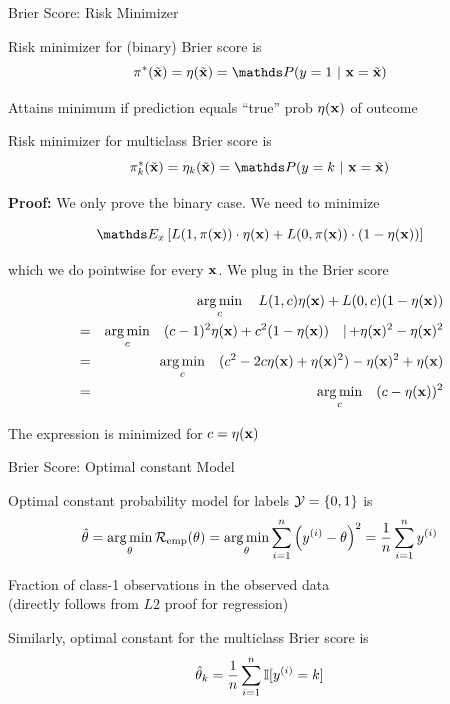 \documentclass[11pt,compress,t,notes=noshow, xcolor=table]{beamer}
\begin{document}
\begin{vbframe}{Brier Score: Risk Minimizer}

\begin{itemizeL}
    \item Risk minimizer for (binary) Brier score is $$\piastxtil = \eta(\xtil) = \P(y=1~|~\xv = \xtil)$$
    \item Attains minimum if prediction equals \enquote{true} prob $\eta(\mathbf{x})$ of outcome
    \item Risk minimizer for multiclass Brier score is 
$$\pi^{\ast}_k(\xtil) = \eta_k(\xtil) =  \P(y = k ~|~ \xv = \xtil) $$
\end{itemizeL}

\framebreak
\textbf{Proof: } We only prove the binary case. We need to minimize 

$$
\E_x \left[L(1, \pix) \cdot \eta(\xv) + L(0, \pix) \cdot (1 - \eta(\xv)) \right]
$$

which we do pointwise for every $\mathbf{x}$. We plug in the Brier score

\vspace*{-0.3cm}

\begin{eqnarray*}
	&& \mathop{\mathrm{arg\,min}}_c \quad L(1, c) \eta(\mathbf{x}) + L(0, c) (1 - \eta(\mathbf{x})) \\ 
	&=&  \mathop{\mathrm{arg\,min}}_c \quad (c - 1)^2 \eta(\mathbf{x}) + c^2 (1 - \eta(\mathbf{x}))  \quad |{\,+\eta(\mathbf{x})^2-\eta(\mathbf{x})^2}\\
  &=&  \mathop{\mathrm{arg\,min}}_c \quad (c^2 -2c\eta(\mathbf{x}) + \eta(\mathbf{x})^2)- \eta(\mathbf{x})^2 + \eta(\mathbf{x}) \\
	&=&  \mathop{\mathrm{arg\,min}}_c \quad (c - \eta(\mathbf{x}))^2
\end{eqnarray*}

The expression is minimized for $c = \eta(\mathbf{x})$

\end{vbframe}

\begin{vbframe}{Brier Score: Optimal constant Model}

\begin{itemizeL}
    \item Optimal constant probability model for labels $\mathcal{Y} = \{0, 1\}$ is 
    $$\hat{\theta}=\mathop{\mathrm{arg\,min}}_{\theta} \mathcal{R}_{\text{emp}}(\theta) = \mathop{\mathrm{arg\,min}}_{\theta} \sum\limits_{i=1}^n \left(y^{(i)} - \theta\right)^2 = \frac{1}{n} \sum\limits_{i=1}^n y^{(i)}$$
    \item Fraction of class-1 observations in the observed data\\ (directly follows from $L2$ proof for regression)
    \item Similarly, optimal constant for the multiclass Brier score is $$\hat{\theta}_k = \frac{1}{n}\sum\limits_{i=1}^n \mathbb{I} [y^{(i)} = k]$$
\end{itemizeL}

\end{vbframe}
\end{document}
